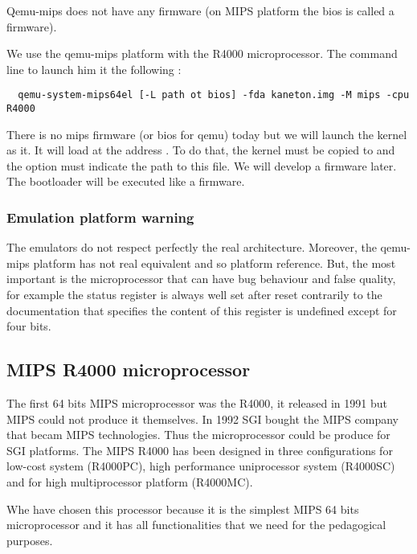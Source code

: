 Qemu-mips does not have any firmware (on MIPS platform the bios is called a firmware).

We use the qemu-mips platform with the R4000 microprocessor. The command line to launch him it the following :

\begin{verbatim}
  qemu-system-mips64el [-L path ot bios] -fda kaneton.img -M mips -cpu R4000
\end{verbatim}

There is no mips firmware (or bios for qemu) today but we will launch the kernel as it. It will load at the address . To do that, the kernel must be copied to  and the  option must indicate the path to this file. We will develop a firmware later.
The bootloader will be executed like a firmware.

\subsubsection{Emulation platform warning}

The emulators do not respect perfectly the real architecture. Moreover, the qemu-mips platform has not
real equivalent and so platform reference. But, the most important is the microprocessor that can have bug behaviour
and false quality, for example the status register is always well set after reset contrarily to the documentation that specifies the content of this register
is undefined except for four bits.

\subsection{MIPS R4000 microprocessor}

The first 64 bits MIPS microprocessor was the R4000, it released in 1991 but MIPS could not produce it themselves.
In 1992 SGI bought the MIPS company that becam MIPS technologies. Thus the microprocessor could be produce for SGI platforms. The MIPS R4000 has been designed in three configurations for low-cost system (R4000PC), high performance uniprocessor system (R4000SC) and for high multiprocessor platform (R4000MC).

Whe have chosen this processor because it is the simplest MIPS 64 bits microprocessor and it has all functionalities that we need for the pedagogical purposes.
